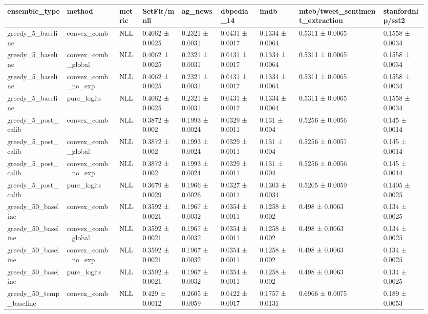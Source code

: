 \begin{tabular}{lllllllll}
\toprule
ensemble_type & method & metric & SetFit/mnli & ag_news & dbpedia_14 & imdb & mteb/tweet_sentiment_extraction & stanfordnlp/sst2 \\
\midrule
greedy_5_baseline & convex_comb & NLL & 0.4062 ± 0.0025 & 0.2321 ± 0.0031 & 0.0431 ± 0.0017 & 0.1334 ± 0.0064 & 0.5311 ± 0.0065 & 0.1558 ± 0.0034 \\
greedy_5_baseline & convex_comb_global & NLL & 0.4062 ± 0.0025 & 0.2321 ± 0.0031 & 0.0431 ± 0.0017 & 0.1334 ± 0.0064 & 0.5311 ± 0.0065 & 0.1558 ± 0.0034 \\
greedy_5_baseline & convex_comb_no_exp & NLL & 0.4062 ± 0.0025 & 0.2321 ± 0.0031 & 0.0431 ± 0.0017 & 0.1334 ± 0.0064 & 0.5311 ± 0.0065 & 0.1558 ± 0.0034 \\
greedy_5_baseline & pure_logits & NLL & 0.4062 ± 0.0025 & 0.2321 ± 0.0031 & 0.0431 ± 0.0017 & 0.1334 ± 0.0064 & 0.5311 ± 0.0065 & 0.1558 ± 0.0034 \\
greedy_5_post_calib & convex_comb & NLL & 0.3872 ± 0.002 & 0.1993 ± 0.0024 & 0.0329 ± 0.0011 & 0.131 ± 0.004 & 0.5256 ± 0.0056 & 0.145 ± 0.0014 \\
greedy_5_post_calib & convex_comb_global & NLL & 0.3872 ± 0.002 & 0.1993 ± 0.0024 & 0.0329 ± 0.0011 & 0.131 ± 0.004 & 0.5256 ± 0.0057 & 0.145 ± 0.0014 \\
greedy_5_post_calib & convex_comb_no_exp & NLL & 0.3872 ± 0.002 & 0.1993 ± 0.0024 & 0.0329 ± 0.0011 & 0.131 ± 0.004 & 0.5256 ± 0.0056 & 0.145 ± 0.0014 \\
greedy_5_post_calib & pure_logits & NLL & 0.3679 ± 0.0029 & 0.1966 ± 0.0026 & 0.0327 ± 0.0011 & 0.1303 ± 0.0034 & 0.5205 ± 0.0059 & 0.1405 ± 0.0025 \\
greedy_50_baseline & convex_comb & NLL & 0.3592 ± 0.0021 & 0.1967 ± 0.0032 & 0.0354 ± 0.0011 & 0.1258 ± 0.002 & 0.498 ± 0.0063 & 0.134 ± 0.0025 \\
greedy_50_baseline & convex_comb_global & NLL & 0.3592 ± 0.0021 & 0.1967 ± 0.0032 & 0.0354 ± 0.0011 & 0.1258 ± 0.002 & 0.498 ± 0.0063 & 0.134 ± 0.0025 \\
greedy_50_baseline & convex_comb_no_exp & NLL & 0.3592 ± 0.0021 & 0.1967 ± 0.0032 & 0.0354 ± 0.0011 & 0.1258 ± 0.002 & 0.498 ± 0.0063 & 0.134 ± 0.0025 \\
greedy_50_baseline & pure_logits & NLL & 0.3592 ± 0.0021 & 0.1967 ± 0.0032 & 0.0354 ± 0.0011 & 0.1258 ± 0.002 & 0.498 ± 0.0063 & 0.134 ± 0.0025 \\
greedy_50_temp_baseline & convex_comb & NLL & 0.429 ± 0.0012 & 0.2605 ± 0.0059 & 0.0422 ± 0.0017 & 0.1757 ± 0.0131 & 0.6966 ± 0.0075 & 0.189 ± 0.0053 \\

\end{tabular}
